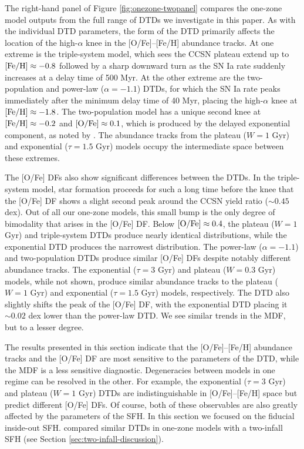 \documentclass[twocolumn,twocolappendix]{aastex631}
\begin{document}
The right-hand panel of Figure \ref{fig:onezone-twopanel} compares the one-zone model outputs from the full range of DTDs we investigate in this paper. As with the individual DTD parameters, the form of the DTD primarily affects the location of the high-$\alpha$ knee in the [O/Fe]--[Fe/H] abundance tracks. At one extreme is the triple-system model, which sees the CCSN plateau extend up to ${\rm [Fe/H]}\approx-0.8$ followed by a sharp downward turn as the SN Ia rate suddenly increases at a delay time of 500 Myr. 
At the other extreme are the two-population and power-law ($\alpha=-1.1$) DTDs, for which the SN Ia rate peaks immediately after the minimum delay time of 40 Myr, placing the high-$\alpha$ knee at ${\rm [Fe/H]}\approx-1.8$. The two-population model has a unique second knee at ${\rm [Fe/H]}\approx-0.2$ and ${\rm [O/Fe]}\approx0.1$, which is produced by the delayed exponential component, as noted by \citet{Vincenzo2017-ChemicalEvolution}. The abundance tracks from the plateau ($W=1$ Gyr) and exponential ($\tau=1.5$ Gyr) models occupy the intermediate space between these extremes. 

The [O/Fe] DFs also show significant differences between the DTDs. In the triple-system model, star formation proceeds for such a long time before the knee that the [O/Fe] DF shows a slight second peak around the CCSN yield ratio ($\sim0.45$ dex). Out of all our one-zone models, this small bump is the only degree of bimodality that arises in the [O/Fe] DF. Below ${\rm [O/Fe]}\approx0.4$, the plateau ($W=1$ Gyr) and triple-system DTDs produce nearly identical distributions, while the exponential DTD produces the narrowest distribution. The power-law ($\alpha=-1.1$) and two-population DTDs produce similar [O/Fe] DFs despite notably different abundance tracks. The exponential ($\tau=3$ Gyr) and plateau ($W=0.3$ Gyr) models, while not shown, produce similar abundance tracks to the plateau ($W=1$ Gyr) and exponential ($\tau=1.5$ Gyr) models, respectively.
The DTD also slightly shifts the peak of the [O/Fe] DF, with the exponential DTD placing it $\sim 0.02$ dex lower than the power-law DTD. We see similar trends in the MDF, but to a lesser degree.

The results presented in this section indicate that the [O/Fe]--[Fe/H] abundance tracks and the [O/Fe] DF are most sensitive to the parameters of the DTD, while the MDF is a less sensitive diagnostic. Degeneracies between models in one regime can be resolved in the other. For example, the exponential ($\tau=3$ Gyr) and plateau ($W=1$ Gyr) DTDs are indistinguishable in [O/Fe]--[Fe/H] space but predict different [O/Fe] DFs. Of course, both of these observables are also greatly affected by the parameters of the SFH. In this section we focused on the fiducial inside-out SFH. \citet{Palicio2023-AnalyticDTD} compared similar DTDs in one-zone models with a two-infall SFH (see Section \ref{sec:two-infall-discussion}).
\end{document}
